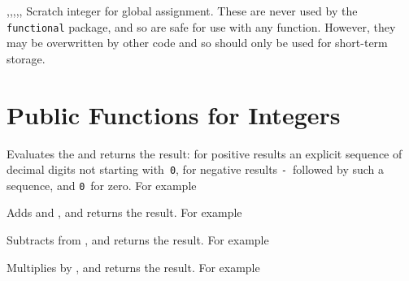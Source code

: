 \documentclass[oneside]{book}
\begin{document}
\begin{variable}{\gTmpaInt,\gTmpbInt,\gTmpcInt,\gTmpiInt,\gTmpjInt,\gTmpkInt}
Scratch integer for global assignment. These are never used by
the \verb!functional! package, and so are safe for use with any
function. However, they may be overwritten by other
code and so should only be used for short-term storage.
\end{variable}

\section{Public Functions for Integers}

\begin{function}{\IntEval}
\begin{syntax}
 
\end{syntax}
Evaluates the  and returns the result:
for positive results an
explicit sequence of decimal digits not starting with~\texttt{0},
for negative results \texttt{-}~followed by such a sequence, and
\texttt{0}~for zero. For example
\begin{demohigh}
\end{demohigh}
\end{function}

\begin{function}{\IntMathAdd}
\begin{syntax}
  
\end{syntax}
Adds  and ,
and returns the result. For example
\begin{demohigh}
\end{demohigh}
\end{function}

\begin{function}{\IntMathSub}
\begin{syntax}
  
\end{syntax}
Subtracts  from ,
and returns the result. For example
\begin{demohigh}
\end{demohigh}
\end{function}

\begin{function}{\IntMathMult}
\begin{syntax}
  
\end{syntax}
Multiplies  by ,
and returns the result. For example
\begin{demohigh}
\end{demohigh}
\end{function}
\end{document}
